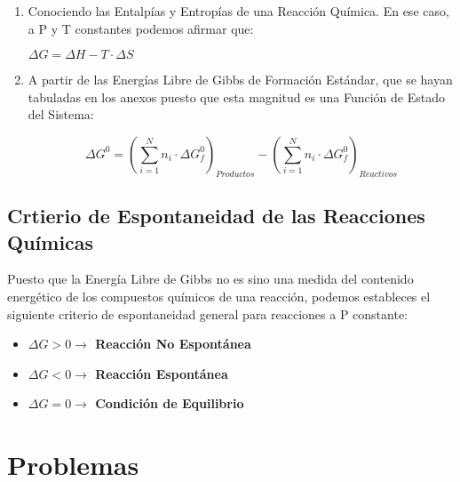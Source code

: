 \begin{enumerate}
	\item  Conociendo las Entalpías y Entropías de una Reacción Química. En ese caso, a P y T constantes podemos afirmar que:
	\begin{center}
		$\Delta G = \Delta H -T \cdot \Delta S$
	\end{center}

	\item A partir de las Energías Libre de Gibbs de Formación Estándar, que se hayan tabuladas en los anexos puesto que esta magnitud es una Función de Estado del Sistema:
	\begin{center}
			$$\Delta G^0 = (\sum_{i=1}^{N} n_i \cdot \Delta G_f^0)_{Productos} - (\sum_{i=1}^{N} n_i \cdot \Delta G_f^0)_{Reactivos}$$
	\end{center}
		
\end{enumerate}

\subsection{Crtierio de Espontaneidad de las Reacciones Químicas}

Puesto que la Energía Libre de Gibbs no es sino una medida del contenido energético de los compuestos químicos de una reacción, podemos estableces el siguiente criterio de espontaneidad general para reacciones a P constante:\\

\begin{itemize}
	\item \textbf{$\Delta G > 0 \longrightarrow$ Reacción No Espontánea}\\
	\item \textbf{$\Delta G < 0 \longrightarrow$ Reacción Espontánea}\\
	\item \textbf{$\Delta G = 0 \longrightarrow$ Condición de Equilibrio}
\end{itemize}

\newpage

\section{Problemas}

